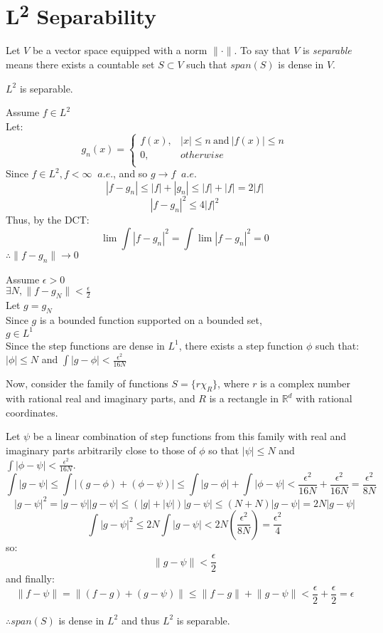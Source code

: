 \documentclass[letterpaper,12pt,fleqn]{article}
\newcommand{\Rd}{\mathbb{R}^d}
\newcommand{\abs}[1]{\left|#1\right|}
\newcommand{\norm}[1]{\lVert#1\rVert}
\begin{document}
\section*{L\textsuperscript{2} Separability}

\begin{definition}
Let $V$ be a vector space equipped with a norm $\norm{\cdot}$. To say that $V$
is \emph{separable} means there exists a countable set $S\subset V$ such that
$span(S)$ is dense in $V$.
\end{definition}

\begin{theorem}
$L^2$ is separable.
\end{theorem}

\begin{theproof}
Assume $f\in L^2$ \\
Let:
\[g_n(x)=\begin{cases}
f(x), & \abs{x}\le n\ \mbox{and}\ \abs{f(x)}\le n \\
0, & otherwise \\
\end{cases}\]
Since $f\in L^2, f<\infty\;\;a.e.$, and so $g\to f\;\;a.e.$
\[\abs{f-g_n}\le\abs{f}+\abs{g_n}\le \abs{f}+\abs{f}=2\abs{f}\]
\[\abs{f-g_n}^2\le4\abs{f}^2\]
Thus, by the DCT:
\[\lim\int\abs{f-g_n}^2=\int\lim\abs{f-g_n}^2=0\]
$\therefore \norm{f-g_n}\to0$

Assume $\epsilon>0$ \\
$\exists N,\norm{f-g_N}<\frac{\epsilon}{2}$ \\
Let $g=g_N$ \\
Since $g$ is a bounded function supported on a bounded set, \\
$g\in L^1$ \\
Since the step functions are dense in $L^1$, there exists a step function
$\phi$ such that: \\
$\abs{\phi}\le N$ and $\int\abs{g-\phi}<\frac{\epsilon^2}{16N}$

Now, consider the family of functions $S=\{r\chi_R\}$, where $r$ is a complex
number with rational real and imaginary parts, and $R$ is a rectangle in $\Rd$
with rational coordinates.

Let $\psi$ be a linear combination of step functions from this family with real
and imaginary parts arbitrarily close to those of $\phi$ so that
$\abs{\psi}\le N$ and $\int\abs{\phi-\psi}<\frac{\epsilon^2}{16N}$.
\[\int\abs{g-\psi}\le\int\abs{(g-\phi)+(\phi-\psi)}\le
    \int\abs{g-\phi}+\int\abs{\phi-\psi}<
    \frac{\epsilon^2}{16N}+\frac{\epsilon^2}{16N}=
    \frac{\epsilon^2}{8N}\]
\[\abs{g-\psi}^2=\abs{g-\psi}\abs{g-\psi}\le(\abs{g}+\abs{\psi})\abs{g-\psi}\le
    (N+N)\abs{g-\psi}=2N\abs{g-\psi}\]
\[\int\abs{g-\psi}^2\le2N\int\abs{g-\psi}<
    2N\left(\frac{\epsilon^2}{8N}\right)=\frac{\epsilon^2}{4}\]
so:
\[\norm{g-\psi}<\frac{\epsilon}{2}\]
and finally:
\[\norm{f-\psi}=\norm{(f-g)+(g-\psi)}\le\norm{f-g}+\norm{g-\psi}<
    \frac{\epsilon}{2}+\frac{\epsilon}{2}=\epsilon\]

$\therefore span(S)$ is dense in $L^2$ and thus $L^2$ is separable.
\end{theproof}
\end{document}
